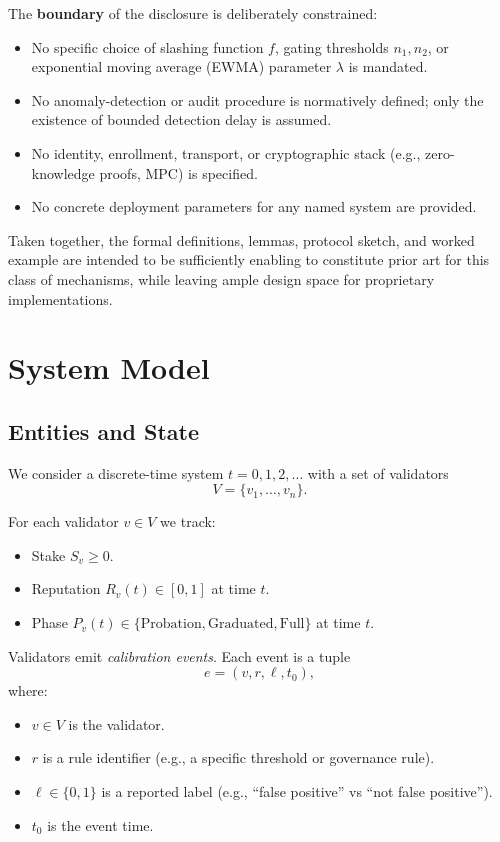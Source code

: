 \documentclass[11pt]{article}
\theoremstyle{plain}
\theoremstyle{definition}
\begin{document}
The \textbf{boundary} of the disclosure is deliberately constrained:
\begin{itemize}[leftmargin=*]
  \item No specific choice of slashing function \(f\), gating thresholds \(n_1,n_2\), or exponential moving average (EWMA) parameter \(\lambda\) is mandated.
  \item No anomaly-detection or audit procedure is normatively defined; only the existence of bounded detection delay is assumed.
  \item No identity, enrollment, transport, or cryptographic stack (e.g., zero-knowledge proofs, MPC) is specified.
  \item No concrete deployment parameters for any named system are provided.
\end{itemize}

Taken together, the formal definitions, lemmas, protocol sketch, and worked example are intended to be sufficiently enabling to constitute prior art for this class of mechanisms, while leaving ample design space for proprietary implementations.

\section{System Model}

\subsection{Entities and State}

We consider a discrete-time system \(t = 0,1,2,\dots\) with a set of validators
\[
V = \{v_1,\dots,v_n\}.
\]

For each validator \(v \in V\) we track:
\begin{itemize}[leftmargin=*]
  \item Stake \(S_v \ge 0\).
  \item Reputation \(R_v(t) \in [0,1]\) at time \(t\).
  \item Phase \(P_v(t) \in \{\mathrm{Probation}, \mathrm{Graduated}, \mathrm{Full}\}\) at time \(t\).
\end{itemize}

Validators emit \emph{calibration events}. Each event is a tuple
\[
e = (v, r, \ell, t_0),
\]
where:
\begin{itemize}[leftmargin=*]
  \item \(v \in V\) is the validator.
  \item \(r\) is a rule identifier (e.g., a specific threshold or governance rule).
  \item \(\ell \in \{0,1\}\) is a reported label (e.g., ``false positive'' vs ``not false positive'').
  \item \(t_0\) is the event time.
\end{itemize}
\end{document}
